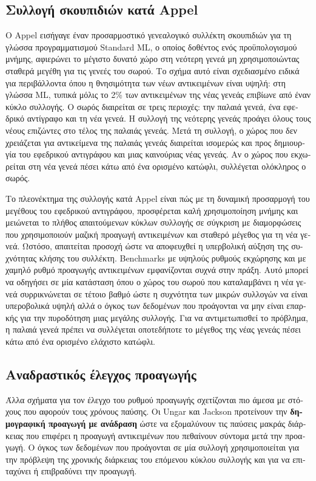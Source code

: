 \begin{greek}
\subsection{Συλλογή σκουπιδιών κατά Appel}
Ο Appel \cite{DBLP:journals/spe/Appel89a} εισήγαγε έναν προσαρμοστικό
γενεαλογικό συλλέκτη σκουπιδιών για τη γλώσσα προγραμματισμού
Standard ML, ο οποίος δοθέντος ενός προϋπολογισμού μνήμης,
αφιερώνει το μέγιστο δυνατό χώρο στη νεότερη γενεά μη χρησιμοποιώντας
σταθερά μεγέθη για τις γενεές του σωρού. Το σχήμα αυτό είναι
σχεδιασμένο ειδικά για περιβάλλοντα όπου η θνησιμότητα των
νέων αντικειμένων είναι υψηλή: στη γλώσσα ML, τυπικά μόλις το
2\% των αντικειμένων της νέας γενεάς επιβίωνε από έναν κύκλο
συλλογής. Ο σωρός διαιρείται σε τρεις περιοχές: την παλαιά γενεά,
ένα εφεδρικό αντίγραφο και τη νέα γενεά. Η συλλογή της νεότερης
γενεάς προάγει όλους τους νέους επιζώντες στο τέλος της παλαιάς
γενεάς. Μετά τη συλλογή, ο χώρος που δεν χρειάζεται για αντικείμενα
της παλαιάς γενεάς διαιρείται ισομερώς και προς δημιουργία του
εφεδρικού αντιγράφου και μιας καινούριας νέας γενεάς. Αν ο χώρος
που εκχωρείται στη νέα γενεά πέσει κάτω από ένα ορισμένο κατώφλι,
συλλέγεται ολόκληρος ο σωρός.

Το πλεονέκτημα της συλλογής κατά Appel είναι πώς με τη δυναμική
προσαρμογή του μεγέθους του εφεδρικού αντιγράφου, προσφέρεται
καλή χρησιμοποίηση μνήμης και μειώνεται το πλήθος απαιτούμενων
κύκλων συλλογής σε σύγκριση με διαμορφώσεις που χρησιμοποιούν
μαζική προαγωγή αντικειμένων και σταθερό μέγεθος για τη νέα
γενεά. Ωστόσο, απαιτείται προσοχή ώστε να αποφευχθεί η υπερβολική
αύξηση της συχνότητας κλήσης του συλλέκτη. Benchmarks με υψηλούς
ρυθμούς εκχώρησης και με χαμηλό ρυθμό προαγωγής αντικειμένων
εμφανίζονται συχνά στην πράξη. Αυτό μπορεί να οδηγήσει σε μία
κατάσταση όπου ο χώρος του σωρού που καταλαμβάνει η νέα γενεά
συρρικνώνεται σε τέτοιο βαθμό ώστε η συχνότητα των μικρών συλλογών
να είναι υπεροβολικά υψηλή αλλά ο όγκος των δεδομένων που προάγονται
να μην είναι επαρκής για την πυροδότηση μιας μεγάλης συλλογής.
Για να αντιμετωπισθεί το πρόβλημα, η παλαιά γενεά πρέπει να
συλλέγεται οποτεδήποτε το μέγεθος της νέας γενεάς πέσει κάτω
από ένα ορισμένο ελάχιστο κατώφλι.

\subsection{Αναδραστικός έλεγχος προαγωγής}
Άλλα σχήματα για τον έλεγχο του ρυθμού προαγωγής σχετίζονται
πιο άμεσα με στόχους που αφορούν τους χρόνους παύσης. Οι Ungar
και Jackson \cite{DBLP:conf/oopsla/UngarJ88, DBLP:journals/toplas/UngarJ92}
προτείνουν την \textbf{δημογραφική προαγωγή με ανάδραση} ώστε
να εξομαλύνουν τις παύσεις μακράς διάρκειας που επιφέρει η
προαγωγή αντικειμένων που πεθαίνουν σύντομα μετά την προαγωγή.
Ο όγκος των δεδομένων που προάγονται σε μία συλλογή χρησιμοποιείται
για την πρόβλεψη της χρονικής διάρκειας του επόμενου κύκλου
συλλογής και για να επιταχύνει ή επιβραδύνει την προαγωγή.


\end{greek}
